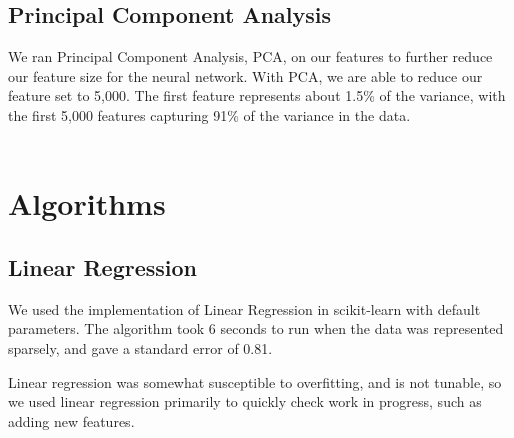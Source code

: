 \documentclass[journal]{IEEEtran}
\begin{document}
\subsection{Principal Component Analysis}
We ran Principal Component Analysis, PCA, on our features to further reduce
our feature size for the neural network. With PCA, we
are able to reduce our feature set to 5,000.  The first feature
represents about 1.5\% of the variance, with the first 5,000 features
capturing 91\% of the variance in the data.
\\
\\

\section{Algorithms}

\subsection{Linear Regression}
We used the implementation of Linear Regression in scikit-learn with default
parameters. The algorithm took 6 seconds to run when the data was represented
sparsely, and gave a standard error of 0.81.
\\
\par Linear regression was somewhat susceptible to overfitting, and is not tunable, so we used
linear regression primarily to quickly check work in progress, such as adding new features.
\end{document}
